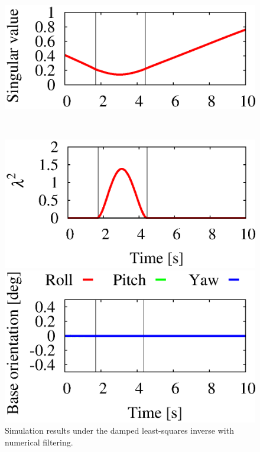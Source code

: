 \begin{figure}[t]
\begin{minipage}[h]{0.40\linewidth}
  \end{minipage}
  \begin{minipage}[h]{0.40\linewidth}
    \centering
    \includegraphics[width=1.0\linewidth]{fig/chapter4/inspection/singularity/DLS/U18_minimal_singular_value.eps}
  \end{minipage}\\
  \vspace{-7mm}
  \begin{minipage}[h]{0.40\linewidth}
    \centering
    \includegraphics[width=1.0\linewidth]{fig/chapter4/inspection/singularity/DLS/U19_interpolation.eps}
  \end{minipage}
  \begin{minipage}[h]{0.40\linewidth}
    \centering
    \includegraphics[width=1.0\linewidth]{fig/chapter4/inspection/singularity/DLS/X02_Base_Orientation.eps}
  \end{minipage}
  \caption{Simulation results under the damped least-squares inverse with numerical filtering.}
  \label{fig:RES_DLS}
\end{figure}
